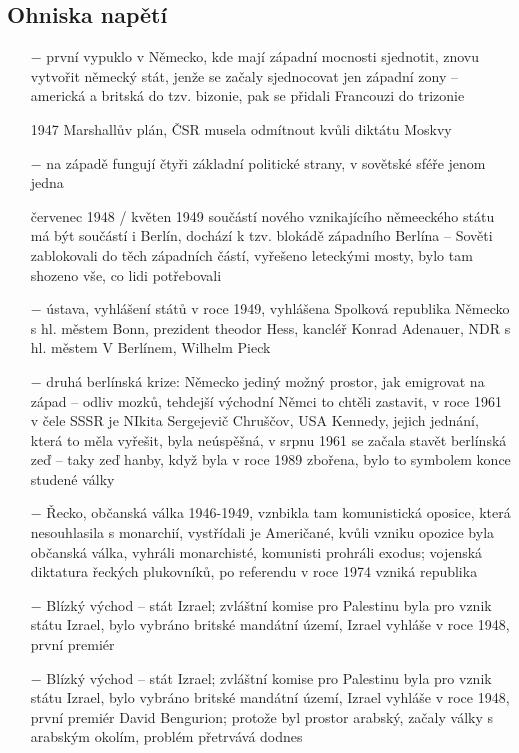 \documentclass{article}
\begin{document}
\begin{itemize}
\end{itemize}

\subsection*{Ohniska napětí}
\begin{itemize}
    \vspace{-0.5em}
    \setlength\itemsep{0.15em}
    \item[$-$] první vypuklo v Německo, kde mají západní mocnosti sjednotit, znovu vytvořit německý stát, jenže se začaly sjednocovat jen západní zony -- americká a britská do tzv. bizonie, pak se přidali Francouzi do trizonie
    \item[1947] Marshallův plán, ČSR musela odmítnout kvůli diktátu Moskvy
    \item[$-$] na západě fungují čtyři základní politické strany, v sovětské sféře jenom jedna
    \item[červenec 1948 / květen 1949] součástí nového vznikajícího němeeckého státu má být součástí i Berlín, dochází k tzv. blokádě západního Berlína -- Sověti zablokovali do těch západních částí, vyřešeno leteckými mosty, bylo tam shozeno vše, co lidi potřebovali
    \item[$-$] ústava, vyhlášení států v roce 1949, vyhlášena Spolková republika Německo s hl. městem Bonn, prezident theodor Hess, kancléř Konrad Adenauer, NDR s hl. městem V Berlínem, Wilhelm Pieck
    \item[$-$] druhá berlínská krize: Německo jediný možný prostor, jak emigrovat na západ -- odliv mozků, tehdejší východní Němci to chtěli zastavit, v roce 1961 v čele SSSR je NIkita Sergejevič Chruščov, USA Kennedy, jejich jednání, která to měla vyřešit, byla neúspěšná, v srpnu 1961 se začala stavět berlínská zeď -- taky zeď hanby, když byla v roce 1989 zbořena, bylo to symbolem konce studené války
    \item[$-$] Řecko, občanská válka 1946-1949, vznbikla tam komunistická oposice, která nesouhlasila s monarchií, vystřídali je Američané, kvůli vzniku opozice byla občanská válka, vyhráli monarchisté, komunisti prohráli exodus; vojenská diktatura řeckých plukovníků, po referendu v roce 1974 vzniká republika
    \item[$-$] Blízký východ -- stát Izrael; zvláštní komise pro Palestinu byla pro vznik státu Izrael, bylo vybráno britské mandátní území, Izrael vyhláše v roce 1948, první premiér
    \item[$-$] Blízký východ -- stát Izrael; zvláštní komise pro Palestinu byla pro vznik státu Izrael, bylo vybráno britské mandátní území, Izrael vyhláše v roce 1948, první premiér David Bengurion; protože byl prostor arabský, začaly války s arabským okolím, problém přetrvává dodnes

\end{itemize}
\end{document}
